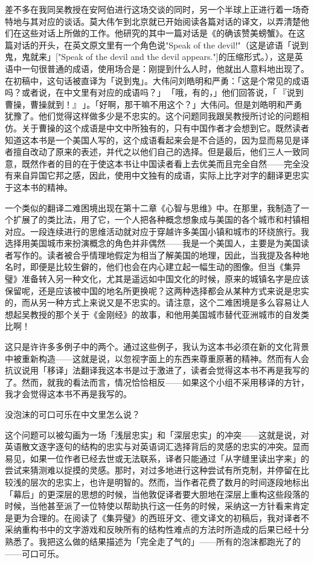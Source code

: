 \documentclass[
  12pt,
  twoside,
  openright,
  oldfontcommands,
]{memoir}
\begin{document}
差不多在我同吴教授在安阿伯进行这场交谈的同时，另一个半球上正进行着一场奇特地与其对应的谈话。莫大伟乍到北京就已开始阅读各篇对话的译文，以弄清楚他们在这些对话上所做的工作。他研究的其中一篇对话是《的确该赞美螃蟹》。在这篇对话的开头，在英文原文里有一个角色说"Speak
of the devil!"（这是谚语「说到鬼，鬼就来」{[}"Speak of the devil and the
devil
appears."{]}的压缩形式。），这是英语中一句很普通的成语，使用场合是：刚提到什么人时，他就出人意料地出现了。在初稿中，这句话被直译为「说到鬼」。大伟问刘皓明和严勇：「这是个常见的成语吗？或者说，在中文里有对应的成语吗？」\,「哦，有的，」他们回答说，「\,『说到曹操，曹操就到！』\,」。「好啊，那干嘛不用这个？」大伟问。但是刘皓明和严勇犹豫了。他们觉得这样做多少是不忠实的。这个问题同我跟吴教授所讨论的问题相仿。关于曹操的这个成语是中文中所独有的，只有中国作者才会想到它。既然读者知道这本书是一个美国人写的，这个成语看起来会是不合适的，因为显而易见是译者擅自改动了原来的表述，并代之以他们自己的选择。但是最后，他们三人一致同意，既然作者的目的在于使这本书让中国读者看上去优美而且完全自然------完全没有来自异国它邦之感，因此，使用中文独有的成语，实际上比字对字的翻译更忠实于这本书的精神。

一个类似的翻译二难困境出现在第十二章《心智与思维》中。在那里，我制造了一个扩展了的类比法，用了它，一个人把各种概念想象成与美国的各个城市和村镇相对应。一段连续进行的思维活动就对应于穿越许多美国小镇和城市的环绕旅行。我选择用美国城市来扮演概念的角色并非偶然------我是一个美国人，主要是为美国读者写作的。读者被合乎情理地假定为相当了解美国的地理，因此，当我提及各种地名时，即便是比较生僻的，他们也会在内心建立起一幅生动的图像。但当《集异璧》准备转入另一种文化，尤其是遥远如中国文化的时候，原来的城镇名字是应该保留呢，还是应该被中国的地名所更换呢？这两种选择都会从某种方式来说是忠实的，而从另一种方式上来说又是不忠实的。请注意，这个二难困境是多么容易让人想起吴教授的那个关于《金刚经》的故事，和他用美国城市替代亚洲城市的自发类比啊！

这只是许许多多例子中的两个。通过这些例子，我认为这本书必须在新的文化背景中被重新构造------这就是说，以忽视字面上的东西来尊重原著的精神。然而有人会抗议说用「移译」法翻译我这本书是过于激进了，读者会觉得这本书不再是我写的了。然而，就我的看法而言，情况恰恰相反------如果这个小组不采用移译的方针，我才会觉得这本书不再是我写的。

{没泡沫的}可口可乐在中文里怎么说？

这个问题可以被勾画为一场「浅层忠实」和「深层忠实」的冲突------这就是说，对英语散文逐字逐句的结构的忠实与对英语词汇选择背后的灵感的忠实的冲突。显而易见，如果一位作者已经去世或无法联系，译者只能通过「从字缝里读出字来」的尝试来猜测难以捉摸的灵感。那时，对过多地进行这种尝试有所克制，并停留在比较浅的层次的忠实上，也许是明智的。然而，当作者花费了数月的时间逐段地标出「幕后」的更深层的思想的时候，当他敦促译者要大胆地在深层上重构这些段落的时候，当他甚至派了一位特使以帮助执行这一任务的时候，采纳这一方针看来肯定是更为合理的。在阅读了《集异璧》的西班牙文、德文译文的初稿后，我对译者不采纳重构书中的文字游戏和反映所有的结构性难点的方法时所造成的后果已经十分熟悉了。我把这么做的结果描述为「完全走了气的」------所有的泡沫都跑光了的------可口可乐。
\end{document}
